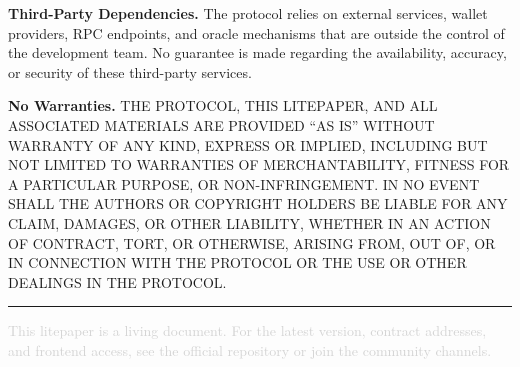 \documentclass[11pt,a4paper]{article}
\begin{document}
\vspace{0.8em}

\noindent\textbf{Third-Party Dependencies.} The protocol relies on external services, wallet providers, RPC endpoints, and oracle mechanisms that are outside the control of the development team. No guarantee is made regarding the availability, accuracy, or security of these third-party services.

\vspace{0.8em}

\noindent\textbf{No Warranties.} THE PROTOCOL, THIS LITEPAPER, AND ALL ASSOCIATED MATERIALS ARE PROVIDED ``AS IS'' WITHOUT WARRANTY OF ANY KIND, EXPRESS OR IMPLIED, INCLUDING BUT NOT LIMITED TO WARRANTIES OF MERCHANTABILITY, FITNESS FOR A PARTICULAR PURPOSE, OR NON-INFRINGEMENT. IN NO EVENT SHALL THE AUTHORS OR COPYRIGHT HOLDERS BE LIABLE FOR ANY CLAIM, DAMAGES, OR OTHER LIABILITY, WHETHER IN AN ACTION OF CONTRACT, TORT, OR OTHERWISE, ARISING FROM, OUT OF, OR IN CONNECTION WITH THE PROTOCOL OR THE USE OR OTHER DEALINGS IN THE PROTOCOL.

\vspace{2em}
\begin{center}
\textcolor{lightgray}{\rule{0.3\textwidth}{0.4pt}}
\end{center}

\vspace{1em}
\noindent\textcolor{lightgray}{\small This litepaper is a living document. For the latest version, contract addresses, and frontend access, see the official repository or join the community channels.}
\end{document}
